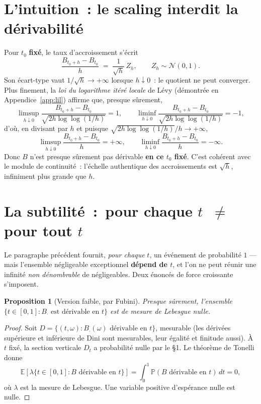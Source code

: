 \documentclass[11pt,a4paper]{article}
\providecommand{\og}{\guillemotleft\,}
\providecommand{\fg}{\,\guillemotright}
\theoremstyle{plain}
\newtheorem{proposition}[theoreme]{Proposition}
\theoremstyle{definition}
\newcommand{\Esp}{\mathbb{E}}
\newcommand{\Prob}{\mathbb{P}}
\newcommand{\Loi}{\mathcal{N}}
\newcommand{\ps}{\text{p.s.}}
\begin{document}
\section{L'intuition~: le scaling interdit la d\'erivabilit\'e}

Pour $t_0$ \textbf{fix\'e}, le taux d'accroissement s'\'ecrit
\[
\frac{B_{t_0+h}-B_{t_0}}{h}\;=\;\frac{1}{\sqrt h}\,Z_h,\qquad Z_h\sim\Loi(0,1).
\]
Son \'ecart-type vaut $1/\sqrt h\to+\infty$ lorsque $h\downarrow 0$~: le quotient ne peut converger. Plus finement, la \emph{loi du logarithme it\'er\'e locale} de L\'evy (d\'emontr\'ee en Appendice~\ref{app:lil}) affirme que, presque s\^urement,
\[
\limsup_{h\downarrow 0}\frac{B_{t_0+h}-B_{t_0}}{\sqrt{2h\log\log(1/h)}}=1,
\qquad
\liminf_{h\downarrow 0}\frac{B_{t_0+h}-B_{t_0}}{\sqrt{2h\log\log(1/h)}}=-1,
\]
d'o\`u, en divisant par $h$ et puisque $\sqrt{2h\log\log(1/h)}/h\to+\infty$,
\[
\limsup_{h\downarrow 0}\frac{B_{t_0+h}-B_{t_0}}{h}=+\infty,\qquad
\liminf_{h\downarrow 0}\frac{B_{t_0+h}-B_{t_0}}{h}=-\infty .
\]
Donc $B$ n'est presque s\^urement pas d\'erivable \textbf{en ce $t_0$ fix\'e}. C'est coh\'erent avec le module de continuit\'e~: l'\'echelle authentique des accroissements est $\sqrt h$, infiniment plus grande que $h$.

\section{La subtilit\'e~: \og pour chaque $t$\fg{} $\neq$ \og pour tout $t$\fg}

Le paragraphe pr\'ec\'edent fournit, \emph{pour chaque} $t$, un \'ev\'enement de probabilit\'e $1$ --- mais l'ensemble n\'egligeable exceptionnel \textbf{d\'epend de $t$}, et l'on ne peut r\'eunir une infinit\'e \emph{non d\'enombrable} de n\'egligeables. Deux \'enonc\'es de force croissante s'imposent.

\begin{proposition}[Version faible, par Fubini]
Presque s\^urement, l'ensemble $\{t\in[0,1]:B_\cdot\text{ est d\'erivable en }t\}$ est de mesure de Lebesgue nulle.
\end{proposition}

\begin{proof}
Soit $D=\{(t,\omega):B_\cdot(\omega)\text{ d\'erivable en }t\}$, mesurable (les d\'eriv\'ees sup\'erieure et inf\'erieure de Dini sont mesurables, leur \'egalit\'e et finitude aussi). \`A $t$ fix\'e, la section verticale $D_t$ a probabilit\'e nulle par le \S1. Le th\'eor\`eme de Tonelli donne
\[
\Esp\!\left[\lambda\{t\in[0,1]:B\text{ d\'erivable en }t\}\right]
=\int_0^1\Prob(B\text{ d\'erivable en }t)\,dt=0,
\]
o\`u $\lambda$ est la mesure de Lebesgue. Une variable positive d'esp\'erance nulle est \ps{} nulle.
\end{proof}
\end{document}
